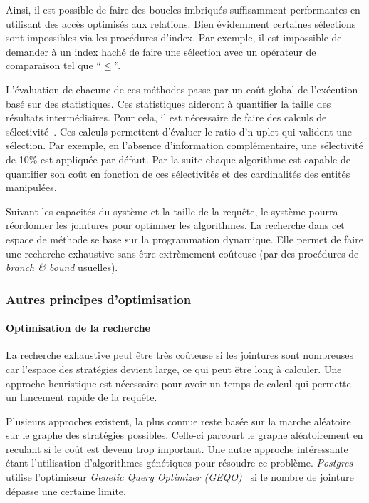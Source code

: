 Ainsi, il est possible de faire des boucles imbriqués suffisamment performantes en utilisant des accès optimisés aux relations. Bien évidemment certaines sélections sont impossibles via les procédures d'index. Par exemple, il est impossible de demander à un index haché de faire une sélection avec un opérateur de comparaison tel que \enquote{$\leq$}.

L'évaluation de chacune de ces méthodes passe par un coût global de l'exécution basé sur des statistiques. Ces statistiques aideront à quantifier la taille des résultats intermédiaires. Pour cela, il est nécessaire de faire des calculs de sélectivité~\cite{Selinger:selectivity}. Ces calculs permettent d'évaluer le ratio d'n-uplet qui valident une sélection. Par exemple, en l'absence d'information complémentaire, une sélectivité de 10\% est appliquée par défaut. Par la suite chaque algorithme est capable de quantifier son coût en fonction de ces sélectivités et des cardinalités des entités manipulées.

Suivant les capacités du système et la taille de la requête, le système pourra réordonner les jointures pour optimiser les algorithmes. La recherche dans cet espace de méthode se base sur la programmation dynamique. Elle permet de faire une recherche exhaustive sans être extrèmement coûteuse (par des procédures de \textit{branch \& bound} usuelles).

\subsubsection{Autres principes d'optimisation}
\paragraph*{Optimisation de la recherche}
La recherche exhaustive peut être très coûteuse si les jointures sont nombreuses car l'espace des stratégies devient large, ce qui peut être long à calculer. Une approche heuristique est nécessaire pour avoir un temps de calcul qui permette un lancement rapide de la requête. 

Plusieurs approches existent, la plus connue reste basée sur la marche aléatoire sur le graphe des stratégies possibles. Celle-ci parcourt le graphe aléatoirement en reculant si le coût est devenu trop important. Une autre approche intéressante étant l'utilisation d'algorithmes génétiques pour résoudre ce problème. \textit{Postgres} utilise l'optimiseur \textit{Genetic Query Optimizer (GEQO)}~\cite{Postgres:geqo} si le nombre de jointure dépasse une certaine limite.

